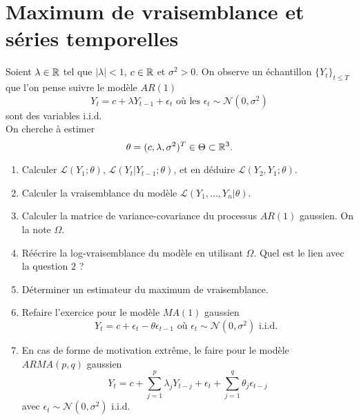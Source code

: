 \section{Maximum de vraisemblance et séries temporelles}

Soient $\lambda\in \mathbb R$ tel que $|\lambda|<1$, $c\in \mathbb R$ et $\sigma^2 >0$. On observe un échantillon $\{Y_t\}_{t\leq T}$ que l'on pense suivre le modèle $AR(1)$
\[Y_t = c +\lambda Y_{t-1} +\epsilon_t  \text{  où les } \epsilon_t \sim \mathcal N(0,\sigma^2)\]
sont des variables i.i.d.\\
On cherche à estimer 
\[\theta = (c,\lambda,\sigma^2)^{T}\in\Theta\subset \mathbb R^3.\]
\begin{enumerate}
\item Calculer $\mathcal L(Y_1;\theta)$, $\mathcal L(Y_t|Y_{t-1};\theta)$, et en déduire $\mathcal L(Y_2,Y_1;\theta)$.
\item Calculer la vraisemblance du modèle $\mathcal L(Y_1,...,Y_n|\theta)$. 
\item Calculer la matrice de variance-covariance du processus $AR(1)$ gaussien. On la note $\Omega$.
\item Réécrire la log-vraisemblance du modèle en utilisant $\Omega$. Quel est le lien avec la question $2$ ?
\item Déterminer un estimateur du maximum de vraisemblance.
\item Refaire l'exercice pour le modèle $MA(1)$ gaussien
\[Y_t = c + \epsilon_t -\theta \epsilon_{t-1}\text{  où } \epsilon_t \sim \mathcal N(0,\sigma^2) \text{ i.i.d. }\]
\item En cas de forme de motivation extrême, le faire pour le modèle $ARMA(p,q)$ gaussien
\[Y_t=c+\sum_{j=1}^p \lambda_{j}Y_{t-j}+\epsilon_t +\sum_{j=1}^q \theta_{j}\epsilon_{t-j}\] 
avec $\epsilon_t \sim \mathcal N(0,\sigma^2)$ i.i.d.
\end{enumerate}

